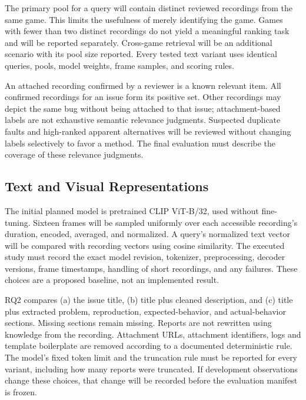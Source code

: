 \documentclass[journal,a4paper,onecolumn]{IEEEtran}
\begin{document}
The primary pool for a query will contain distinct reviewed recordings from the same game. This limits the usefulness of merely identifying the game. Games with fewer than two distinct recordings do not yield a meaningful ranking task and will be reported separately. Cross-game retrieval will be an additional scenario with its pool size reported. Every tested text variant uses identical queries, pools, model weights, frame samples, and scoring rules.

An attached recording confirmed by a reviewer is a known relevant item. All confirmed recordings for an issue form its positive set. Other recordings may depict the same bug without being attached to that issue; attachment-based labels are not exhaustive semantic relevance judgments. Suspected duplicate faults and high-ranked apparent alternatives will be reviewed without changing labels selectively to favor a method. The final evaluation must describe the coverage of these relevance judgments.

\subsection{Text and Visual Representations}
The initial planned model is pretrained CLIP ViT-B/32, used without fine-tuning. Sixteen frames will be sampled uniformly over each accessible recording's duration, encoded, averaged, and normalized. A query's normalized text vector will be compared with recording vectors using cosine similarity. The executed study must record the exact model revision, tokenizer, preprocessing, decoder versions, frame timestamps, handling of short recordings, and any failures. These choices are a proposed baseline, not an implemented result.

RQ2 compares (a) the issue title, (b) title plus cleaned description, and (c) title plus extracted problem, reproduction, expected-behavior, and actual-behavior sections. Missing sections remain missing. Reports are not rewritten using knowledge from the recording. Attachment URLs, attachment identifiers, logs and template boilerplate are removed according to a documented deterministic rule. The model's fixed token limit and the truncation rule must be reported for every variant, including how many reports were truncated. If development observations change these choices, that change will be recorded before the evaluation manifest is frozen.
\end{document}
